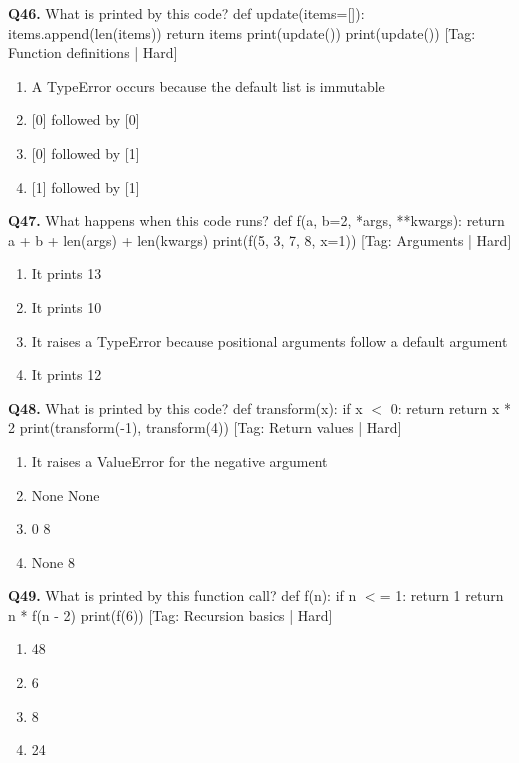 \vspace{2mm}
\noindent\textbf{Q46.} What is printed by this code? def update(items=[]): items.append(len(items)) return items print(update()) print(update()) \hfill [Tag: Function definitions | Hard]
\begin{enumerate}[label=(\alph*),topsep=2pt,itemsep=1pt,partopsep=0pt,parsep=0pt]
    \item {A TypeError occurs because the default list is immutable}
    \item {[0] followed by [0]}
    \item {[0] followed by [1]}
    \item {[1] followed by [1]}
\end{enumerate}
\vspace{2mm}
\noindent\textbf{Q47.} What happens when this code runs? def f(a, b=2, *args, **kwargs): return a + b + len(args) + len(kwargs) print(f(5, 3, 7, 8, x=1)) \hfill [Tag: Arguments | Hard]
\begin{enumerate}[label=(\alph*),topsep=2pt,itemsep=1pt,partopsep=0pt,parsep=0pt]
    \item {It prints 13}
    \item {It prints 10}
    \item {It raises a TypeError because positional arguments follow a default argument}
    \item {It prints 12}
\end{enumerate}
\vspace{2mm}
\noindent\textbf{Q48.} What is printed by this code? def transform(x): if x $<$ 0: return return x * 2 print(transform(-1), transform(4)) \hfill [Tag: Return values | Hard]
\begin{enumerate}[label=(\alph*),topsep=2pt,itemsep=1pt,partopsep=0pt,parsep=0pt]
    \item {It raises a ValueError for the negative argument}
    \item {None None}
    \item {0 8}
    \item {None 8}
\end{enumerate}
\vspace{2mm}
\noindent\textbf{Q49.} What is printed by this function call? def f(n): if n $<$= 1: return 1 return n * f(n - 2) print(f(6)) \hfill [Tag: Recursion basics | Hard]
\begin{enumerate}[label=(\alph*),topsep=2pt,itemsep=1pt,partopsep=0pt,parsep=0pt]
    \item {48}
    \item {6}
    \item {8}
    \item {24}
\end{enumerate}
